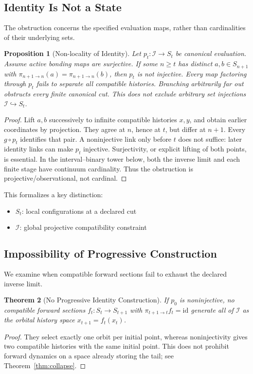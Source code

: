 \documentclass[11pt,a4paper]{article}
\theoremstyle{plain}
\newtheorem{theorem}{Theorem}[section]
\newtheorem{proposition}[theorem]{Proposition}
\theoremstyle{definition}
\theoremstyle{remark}
\begin{document}
\subsection{Identity Is Not a State}

The obstruction concerns the specified evaluation maps, rather than cardinalities of their underlying sets.

\begin{proposition}[Non-locality of Identity]\label{prop:nonlocality}
Let $p_t:\mathcal I\to S_t$ be canonical evaluation. Assume active bonding maps are surjective. If some $n\ge t$ has distinct $a,b\in S_{n+1}$ with $\pi_{n+1\to n}(a)=\pi_{n+1\to n}(b)$, then $p_t$ is not injective. Every map factoring through $p_t$ fails to separate all compatible histories. Branching arbitrarily far out obstructs every finite canonical cut. This does not exclude arbitrary set injections $\mathcal I\hookrightarrow S_t$.
\end{proposition}
\begin{proof}
Lift $a,b$ successively to infinite compatible histories $x,y$, and obtain earlier coordinates by projection. They agree at $n$, hence at $t$, but differ at $n+1$. Every $g\circ p_t$ identifies that pair. A noninjective link only before $t$ does not suffice: later identity links can make $p_t$ injective. Surjectivity, or explicit lifting of both points, is essential. In the interval--binary tower below, both the inverse limit and each finite stage have continuum cardinality. Thus the obstruction is projective/observational, not cardinal.
\end{proof}

This formalizes a key distinction:
\begin{itemize}[leftmargin=*]
    \item $S_t$: local configurations at a declared cut
    \item $\mathcal{I}$: global projective compatibility constraint
\end{itemize}

\subsection{Impossibility of Progressive Construction}

We examine when compatible forward sections fail to exhaust the declared inverse limit.

\begin{theorem}[No Progressive Identity Construction]\label{thm:noprogressive}
If $p_0$ is noninjective, no compatible forward sections $f_t:S_t\to S_{t+1}$ with $\pi_{t+1\to t}f_t=\mathrm{id}$ generate all of $\mathcal I$ as the orbital history space $x_{t+1}=f_t(x_t)$.
\end{theorem}
\begin{proof}
They select exactly one orbit per initial point, whereas noninjectivity gives two compatible histories with the same initial point. This does not prohibit forward dynamics on a space already storing the tail; see Theorem~\ref{thm:collapse}.
\end{proof}
\end{document}
